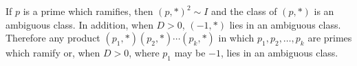 If $p$ is a prime which ramifies, then $(p, *)^2 \sim I$ and the class of $(p, *)$ is an ambiguous class. In addition, when $D > 0$, $(-1, *)$ lies in an ambiguous class. Therefore any product $(p_1, *)(p_2, *) \cdots (p_k, *)$ in which $p_1, p_2, \ldots, p_k$ are primes which ramify or, when $D > 0$, where $p_1$ may be $-1$, lies in an ambiguous class.
